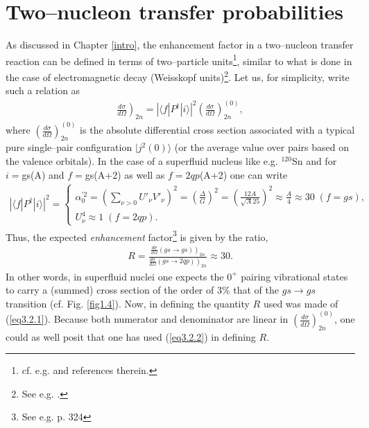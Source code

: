 \section[Transfer probabilities, enhancement factor]{Two--nucleon transfer probabilities}\label{C3S2}
As discussed in Chapter \ref{intro}, the enhancement factor in a two--nucleon transfer reaction can be defined in terms of two--particle units\footnote{cf. e.g. \cite{Broglia:72b,Broglia:73} and references therein.}, similar to what is done in the case of electromagnetic decay (Weisskopf units)\footnote{See e.g. \cite{Bohr:69}.}. Let us, for simplicity, write such a relation as
\begin{align}\label{eq3.2.1}
\left.\frac{d\sigma}{d\Omega}\right)_{2n}=\left|\langle f|P^\dagger|i\rangle \right|^2\left(\frac{d\sigma}{d\Omega}\right)^{(0)}_{2n},
\end{align} 
where $\left(\frac{d\sigma}{d\Omega}\right)^{(0)}_{2n}$ is the absolute differential cross section associated with a typical pure single--pair configuration $|j^2(0)\rangle$ (or the average value over pairs based on the valence orbitals).  In the case of a superfluid nucleus like e.g. $^{120}$Sn and for $i=$gs(A) and $f=$gs(A+2) as well as $f=2qp$(A+2) one can write 
\begin{align}\label{eq3.2.2}
\left|\langle f|P^\dagger|i\rangle \right|^2=\left\{\begin{array}{l}
 \alpha_0^{'2}=\left(\sum_{\nu>0}U'_{\nu}V'_{\nu}\right)^2=\left(\frac{\Delta}{G}\right)^2=\left(\frac{12A}{\sqrt{A}25}\right)^2\approx\frac{A}{4}\approx 30\; (f=gs),\\
 U_\nu^4\approx 1\; (f=2qp).
\end{array} \right.
\end{align} 
Thus, the expected \textit{enhancement} factor\footnote{See e.g. \cite{Brink:05} p. 324} is given by the ratio, 
\begin{align}\label{eq3.2.3}
R=\frac{\left.\frac{d\sigma}{d\Omega}(gs\rightarrow gs)\right)_{2n}}{\left.\frac{d\sigma}{d\Omega}(gs\rightarrow 2qp)\right)_{2n}}\approx 30.
\end{align}
In other words, in superfluid nuclei one expects the $0^+$ pairing vibrational states to carry a (summed) cross section of the order of 3\% that of the $gs\rightarrow gs$ transition (cf. Fig. \ref{fig1.4}).
Now, in defining the quantity $R$ used was made of (\ref{eq3.2.1}). Because both numerator and denominator are linear in $\left(\frac{d\sigma}{d\Omega}\right)_{2n}^{(0)}$, one could as well posit that one has used (\ref{eq3.2.2}) in defining $R$.


